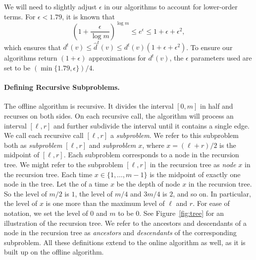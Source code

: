 We will need to slightly adjust $\epsilon$ in our algorithms to account for lower-order terms.
For $\epsilon<1.79$, it is known that
\[\left( 1 + \frac{\epsilon}{\log m}\right)^{\log m} \leq e^\epsilon \leq 1+\epsilon+\epsilon^2,\]
which ensures that $d^t(v) \leq \hat{d}^t(v) \leq d^t(v)(1 + \epsilon + \epsilon^2)$.
To ensure our algorithms return $(1+\epsilon)$ approximations for $d^t(v)$, the $\epsilon$ parameters used are set to be $(\min\{1.79,\epsilon\})/4$. 

\paragraph{Defining Recursive Subproblems.}
The offline algorithm is recursive.
It divides the interval $[0,m]$ in half and recurses on both sides. On each recursive call, the algorithm will process an interval $[\ell, r]$ and further subdivide the interval until it contains a single edge. 
We call each recursive call $[\ell,r]$ a \emph{subproblem}.
We refer to this subproblem both as \emph{subproblem $[\ell,r]$} and \emph{subproblem $x$}, where $x=(\ell+r)/2$ is the midpoint of $[\ell,r]$.
Each subproblem corresponds to a node in the recursion tree.
We might refer to the subproblem $[\ell,r]$ in the recursion tree as \emph{node $x$} in the recursion tree.
Each time $x \in \{1,\ldots,m-1\}$ is the midpoint of exactly one node in the tree.
Let the  of a time $x$ be the depth of node $x$ in the recursion tree. 
So the level of $m/2$ is $1$, the level of $m/4$ and $3m/4$ is $2$, and so on.
In particular, the level of $x$ is one more than the maximum level of $\ell$ and $r$.
For ease of notation, we set the level of 0 and $m$ to be 0. 
See Figure~\ref{fig:tree} for an illustration of the recursion tree.
We refer to the ancestors and descendants of a node in the recursion tree as \emph{ancestors} and \emph{descendants} of the corresponding subproblem.
All these definitions extend to the online algorithm as well, as it is built up on the offline algorithm.


